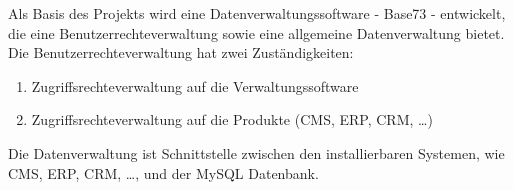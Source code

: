 Als Basis des Projekts wird eine Datenverwaltungssoftware - Base73 - entwickelt, die
eine Benutzerrechteverwaltung sowie eine allgemeine Datenverwaltung bietet.
Die Benutzerrechteverwaltung hat zwei Zuständigkeiten:
\begin{enumerate}
	\item Zugriffsrechteverwaltung auf die Verwaltungssoftware
	\item Zugriffsrechteverwaltung auf die Produkte (CMS, ERP, CRM, \ldots)
\end{enumerate}
Die Datenverwaltung ist Schnittstelle zwischen den installierbaren Systemen, wie CMS, ERP, CRM, \ldots, und der MySQL Datenbank.